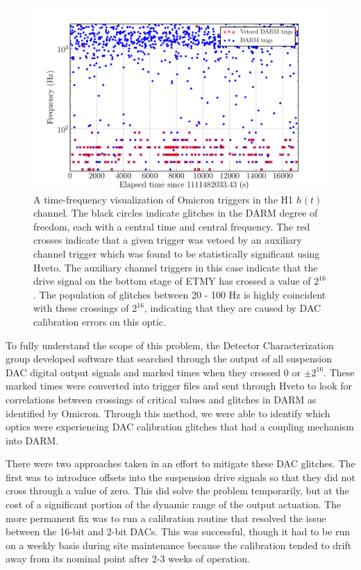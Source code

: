 \begin{figure}[ht!]%
\includegraphics[width=\textwidth]{figures/detchar/vetoed-DAC-glitches}
\caption[Vetoed DARM triggers from DAC calibration]{A time-frequency %
         visualization of Omicron triggers in the H1 $h(t)$ channel. %
         The black circles indicate glitches in the DARM degree of freedom, %
         each with a central time and central frequency. The red crosses %
         indicate that a given trigger was vetoed by an auxiliary channel %
         trigger which was found to be statistically significant using Hveto. The %
         auxiliary channel triggers in this case indicate that the drive signal %
         on the bottom stage of ETMY has crossed a value of $2^{16}$. The %
         population of glitches between 20 - 100 Hz is highly coincident %
         with these crossings of $2^{16}$, indicating that they are caused %
         by DAC calibration errors on this optic.}
\end{figure}

To fully understand the scope of this problem, the Detector Characterization 
group developed software that searched through the output of all suspension 
DAC digital output signals and marked times when they crossed 0 or $\pm2^{16}$. 
These marked times were converted into trigger files and sent through Hveto 
to look for correlations between crossings of critical values and glitches 
in DARM as identified by Omicron. Through this method, we were able to identify 
which optics were experiencing DAC calibration glitches that had a coupling 
mechanism into DARM.

There were two approaches taken in an effort to mitigate these DAC glitches. The 
first was to introduce offsets into the suspension drive signals so that they 
did not cross through a value of zero. This did solve the problem temporarily, 
but at the cost of a significant portion of the dynamic range of the output 
actuation. The more permanent fix was to run a calibration routine 
that resolved the issue between the 16-bit and 2-bit DACs. This was 
successful, though it had to be run on a weekly basis during site maintenance 
because the calibration tended to drift away from its nominal point after 
2-3 weeks of operation.

